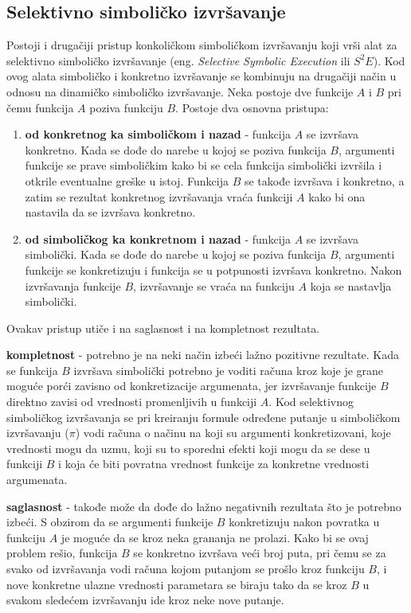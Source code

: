 \documentclass[12pt,oneside]{memoir}
\begin{document}
\subsection{Selektivno simboličko izvršavanje}
Postoji i drugačiji pristup konkoličkom simboličkom izvršavanju koji vrši alat za selektivno simboličko izvršavanje (eng. \textit{Selective Symbolic Execution} ili $S^2E$). Kod ovog alata simboličko i konkretno izvršavanje se kombinuju na drugačiji način u odnosu na dinamičko simboličko izvršavanje. Neka postoje dve funkcije $A$ i $B$ pri čemu funkcija $A$ poziva funkciju $B$.
Postoje dva osnovna pristupa:
\begin{enumerate}
    \item \textbf{od konkretnog ka simboličkom i nazad} - funkcija $A$ se izvršava konkretno. Kada se dođe do narebe u kojoj se poziva funkcija $B$, argumenti funkcije se prave simboličkim kako bi se cela funkcija simbolički izvršila i otkrile eventualne greške u istoj. Funkcija $B$ se takođe izvršava i konkretno, a zatim se rezultat konkretnog izvršavanja vraća funkciji $A$ kako bi ona nastavila da se izvršava konkretno.
    
    \item \textbf{od simboličkog ka konkretnom i nazad} - funkcija $A$ se izvršava simbolički. Kada se dođe do narebe u kojoj se poziva funkcija $B$, argumenti funkcije se konkretizuju i funkcija se u potpunosti izvršava konkretno. Nakon izvršavanja funkcije $B$, izvršavanje se vraća na funkciju $A$ koja se nastavlja simbolički.
\end{enumerate}

Ovakav pristup utiče i na saglasnost i na kompletnost rezultata.

\begin{description}
    \item \textbf{kompletnost} - potrebno je na neki način izbeći lažno pozitivne rezultate. Kada se funkcija $B$ izvršava simbolički potrebno je voditi računa kroz koje je grane moguće porći zavisno od konkretizacije argumenata, jer izvršavanje funkcije $B$ direktno zavisi od vrednosti promenljivih u funkciji $A$. Kod selektivnog simboličkog izvršavanja se pri kreiranju formule određene putanje u simboličkom izvršavanju ($\pi$) vodi računa o načinu na koji su argumenti konkretizovani, koje vrednosti mogu da uzmu, koji su to sporedni efekti koji mogu da se dese u funkciji $B$ i koja će biti povratna vrednost funkcije za konkretne vrednosti argumenata.
    
    \item \textbf{saglasnost} - takođe može da dođe do lažno negativnih rezultata što je potrebno izbeći. S obzirom da se argumenti funkcije $B$ konkretizuju nakon povratka u funkciju $A$ je moguće da se kroz neka grananja ne prolazi. Kako bi se ovaj problem rešio, funkcija $B$ se konkretno izvršava veći broj puta, pri čemu se za svako od izvršavanja vodi računa kojom putanjom se prošlo kroz funkciju $B$, i nove konkretne ulazne vrednosti parametara se biraju tako da se kroz $B$ u svakom sledećem izvršavanju ide kroz neke nove putanje.
\end{description} 
\bigskip
\end{document}
